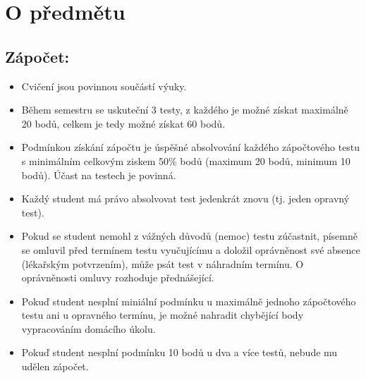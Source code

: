 \documentclass[letterpaper,10pt,english]{jupyterBook}
\begin{document}
\sphinxstepscope


\part{O předmětu}

\sphinxstepscope


\chapter{Zápočet:}
\label{\detokenize{Misc/Podm_xednky_z_xe1po_u010dtu_a_zkou_u0161ky:zapocet}}\label{\detokenize{Misc/Podm_xednky_z_xe1po_u010dtu_a_zkou_u0161ky::doc}}\begin{itemize}
\item {} 
\sphinxAtStartPar
Cvičení jsou povinnou součástí výuky.

\item {} 
\sphinxAtStartPar
Během semestru se uskuteční 3 testy, z každého je možné získat maximálně 20 bodů, celkem je tedy možné získat 60 bodů.

\item {} 
\sphinxAtStartPar
Podmínkou získání zápočtu je úspěšné absolvování každého zápočtového testu s minimálním celkovým ziskem 50\% bodů (maximum 20
bodů, minimum 10 bodů). Účast na testech je povinná.

\item {} 
\sphinxAtStartPar
Každý student má právo absolvovat test jedenkrát znovu (tj. jeden opravný test).

\item {} 
\sphinxAtStartPar
Pokud se student nemohl z vážných důvodů (nemoc) testu zúčastnit, písemně se omluvil před termínem testu vyučujícímu a doložil oprávněnost své absence (lékařským potvrzením), může psát test v náhradním termínu. O oprávněnosti omluvy rozhoduje přednášející.

\item {} 
\sphinxAtStartPar
Pokuď student nesplní miniální podmínku u maximálně jednoho zápočtového testu ani u opravného termínu, je možné nahradit chybějící body vypracováním domácího úkolu.

\item {} 
\sphinxAtStartPar
Pokuď student nesplní podmínku 10 bodů u dva a více testů, nebude mu udělen zápočet.

\end{itemize}
\end{document}
